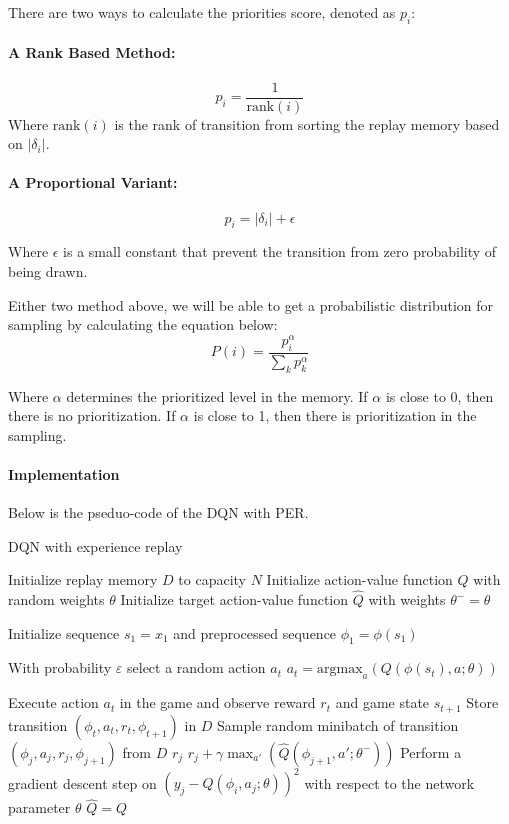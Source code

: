 \documentclass{article}
\begin{document}
There are two ways to calculate the priorities score, denoted as $p_i$:
\paragraph{A Rank Based Method:}
$$p_i = \frac{1}{\text{rank}(i)}$$
Where $\text{rank}(i)$ is the rank of transition from sorting the replay memory based on $|\delta_i|$.

\paragraph{A Proportional Variant:}
$$p_i = |\delta_i| + \epsilon$$

Where $\epsilon$ is a small constant that prevent the transition from zero probability of being drawn. \par 

Either two method above, we will be able to get a probabilistic distribution for sampling by calculating the equation below:
$$P(i) = \frac{p_i^{\alpha}}{\sum_{k}p_k^{\alpha}}$$

Where $\alpha$ determines the prioritized level in the memory. If $\alpha$ is close to 0, then there is no prioritization. If $\alpha$ is close to 1, then there is prioritization in the sampling.

\paragraph{Implementation}
Below is the pseduo-code of the DQN with PER. \par 

\begin{algorithm}[H]
    \caption{DQN with experience replay}
    Initialize replay memory $D$ to capacity $N$ \;
    Initialize action-value function $Q$ with random weights $\theta$\;
    Initialize target action-value function $\hat{Q}$ with weights $\theta^{-} = \theta$\;
    {
        Initialize sequence $s_1 = {x_1}$ and preprocessed sequence $\phi_1 = \phi(s_1)$\;
        {
            {
                With probability $\varepsilon$ select a random action $a_t$\;
            } \Else
            {
                $a_t = \text{argmax}_a(Q(\phi(s_t), a; \theta))$\;
            }

            Execute action $a_t$ in the game and observe reward $r_t$ and game state $s_{t+1}$\;
            Store transition $(\phi_t, a_t, r_t, \phi_{t + 1})$ in $D$\;
            Sample random minibatch of transition $(\phi_j, a_j, r_j, \phi_{j + 1})$ from $D$\;
            {
                $r_j$\;
            } \Else 
            {
                $r_j + \gamma \max_{a'}(\hat{Q}(\phi_{j + 1}, a'; \theta^-))$
            }
            Perform a gradient descent step on $(y_j - Q(\phi_{i}, a_j; \theta))^2$ with respect to the network parameter $\theta$\;
            $\hat{Q} = Q$\;
        }
    }
\end{algorithm}
\end{document}
